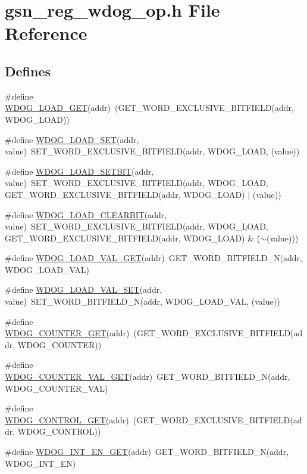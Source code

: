 \hypertarget{a00576}{
\section{gsn\_\-reg\_\-wdog\_\-op.h File Reference}
\label{a00576}
}
\subsection*{Defines}
\begin{DoxyCompactItemize}
\item 
\#define \hyperlink{a00576_a62daf76738a22db0fea0c140b1b62ed0}{WDOG\_\-LOAD\_\-GET}(addr)~(GET\_\-WORD\_\-EXCLUSIVE\_\-BITFIELD(addr, WDOG\_\-LOAD))
\item 
\#define \hyperlink{a00576_ad2e757d74989659e292f7ead2f180848}{WDOG\_\-LOAD\_\-SET}(addr, value)~SET\_\-WORD\_\-EXCLUSIVE\_\-BITFIELD(addr, WDOG\_\-LOAD, (value))
\item 
\#define \hyperlink{a00576_aa697221d121331fd5c41f10ed142ddcb}{WDOG\_\-LOAD\_\-SETBIT}(addr, value)~SET\_\-WORD\_\-EXCLUSIVE\_\-BITFIELD(addr, WDOG\_\-LOAD, GET\_\-WORD\_\-EXCLUSIVE\_\-BITFIELD(addr, WDOG\_\-LOAD) $|$ (value))
\item 
\#define \hyperlink{a00576_a6cb3bc63297c50ae2b02bab9e591dadb}{WDOG\_\-LOAD\_\-CLEARBIT}(addr, value)~SET\_\-WORD\_\-EXCLUSIVE\_\-BITFIELD(addr, WDOG\_\-LOAD, GET\_\-WORD\_\-EXCLUSIVE\_\-BITFIELD(addr, WDOG\_\-LOAD) \& ($\sim$(value)))
\item 
\#define \hyperlink{a00576_ad543aa011f99f3d61abd3dbcadb06266}{WDOG\_\-LOAD\_\-VAL\_\-GET}(addr)~GET\_\-WORD\_\-BITFIELD\_\-N(addr, WDOG\_\-LOAD\_\-VAL)
\item 
\#define \hyperlink{a00576_a36aa66cf4045d921a59ca73c5a3a6890}{WDOG\_\-LOAD\_\-VAL\_\-SET}(addr, value)~SET\_\-WORD\_\-BITFIELD\_\-N(addr, WDOG\_\-LOAD\_\-VAL, (value))
\item 
\#define \hyperlink{a00576_a97eccb8eca6eedd6074ba99268db2b9b}{WDOG\_\-COUNTER\_\-GET}(addr)~(GET\_\-WORD\_\-EXCLUSIVE\_\-BITFIELD(addr, WDOG\_\-COUNTER))
\item 
\#define \hyperlink{a00576_adb303b9dc72aff7ada2bdc5cc6d125de}{WDOG\_\-COUNTER\_\-VAL\_\-GET}(addr)~GET\_\-WORD\_\-BITFIELD\_\-N(addr, WDOG\_\-COUNTER\_\-VAL)
\item 
\#define \hyperlink{a00576_a22ae6e6efb16a7f7eefbb53405e772a3}{WDOG\_\-CONTROL\_\-GET}(addr)~(GET\_\-WORD\_\-EXCLUSIVE\_\-BITFIELD(addr, WDOG\_\-CONTROL))
\item 
\#define \hyperlink{a00576_ad7cbc538b39864878aa31245e17f840d}{WDOG\_\-INT\_\-EN\_\-GET}(addr)~GET\_\-WORD\_\-BITFIELD\_\-N(addr, WDOG\_\-INT\_\-EN)

\end{DoxyCompactItemize}
